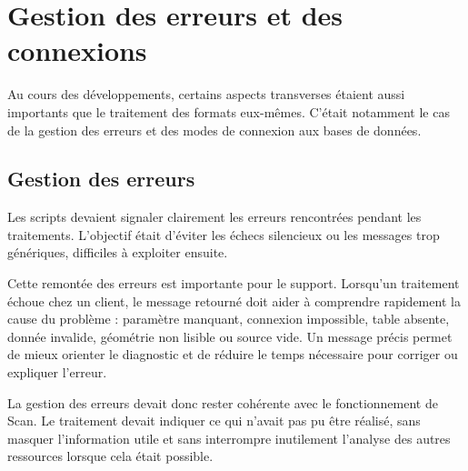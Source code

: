 

\section{Gestion des erreurs et des connexions}
\label{sec:gestion_erreurs_connexions}

Au cours des développements, certains aspects transverses étaient aussi
importants que le traitement des formats eux-mêmes. C'était notamment le cas de
la gestion des erreurs et des modes de connexion aux bases de
données.


\subsection{Gestion des erreurs}
\label{subsec:remontee_erreurs}

Les scripts devaient signaler clairement les erreurs rencontrées pendant les
traitements. L'objectif était d'éviter les échecs silencieux ou les messages
trop génériques, difficiles à exploiter ensuite.

Cette remontée des erreurs est importante pour le support. Lorsqu'un traitement
échoue chez un client, le message retourné doit aider à comprendre rapidement la
cause du problème : paramètre manquant, connexion impossible, table absente,
donnée invalide, géométrie non lisible ou source vide. Un message précis permet
de mieux orienter le diagnostic et de réduire le temps nécessaire pour corriger
ou expliquer l'erreur.

La gestion des erreurs devait donc rester cohérente avec le fonctionnement de
Scan. Le traitement devait indiquer ce qui n'avait pas pu être réalisé, sans
masquer l'information utile et sans interrompre inutilement l'analyse des autres
ressources lorsque cela était possible.


